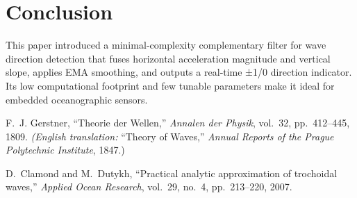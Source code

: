 \documentclass[12pt,letterpaper]{article}
\begin{document}
\section{Conclusion}
This paper introduced a minimal‐complexity complementary filter for wave direction detection that fuses horizontal acceleration magnitude and vertical slope, applies EMA smoothing, and outputs a real‐time ±1/0 direction indicator.  Its low computational footprint and few tunable parameters make it ideal for embedded oceanographic sensors.

\begin{thebibliography}{9}
F.~J. Gerstner, ``Theorie der Wellen,'' 
\emph{Annalen der Physik}, vol.~32, pp.~412–445, 1809.  
\emph{(English translation: }``Theory of Waves,'' \emph{Annual Reports of the Prague Polytechnic Institute}, 1847.)

D.~Clamond and M.~Dutykh, ``Practical analytic approximation of trochoidal waves,'' 
\emph{Applied Ocean Research}, vol.~29, no.~4, pp.~213–220, 2007.
\end{thebibliography}
\end{document}
